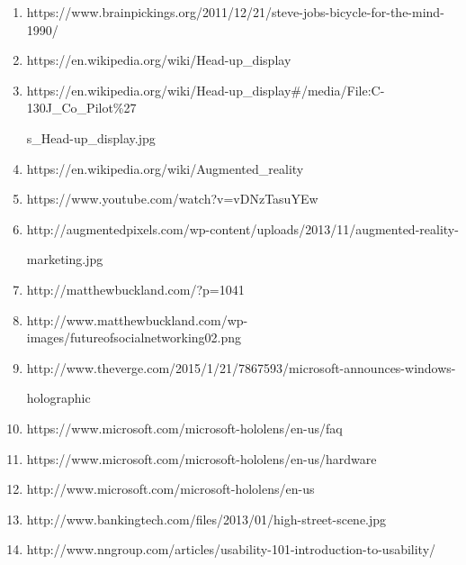 \documentclass[a4paper,12pt]{article}
\begin{document}
\begin{enumerate}
    \item https://www.brainpickings.org/2011/12/21/steve-jobs-bicycle-for-the-mind-1990/
    \item https://en.wikipedia.org/wiki/Head-up\_display
    \item https://en.wikipedia.org/wiki/Head-up\_display\#/media/File:C-130J\_Co\_Pilot\%27

    s\_Head-up\_display.jpg
    \item https://en.wikipedia.org/wiki/Augmented\_reality
    \item https://www.youtube.com/watch?v=vDNzTasuYEw
    \item http://augmentedpixels.com/wp-content/uploads/2013/11/augmented-reality-

    marketing.jpg
    \item http://matthewbuckland.com/?p=1041
    \item http://www.matthewbuckland.com/wp-images/futureofsocialnetworking02.png
    \item http://www.theverge.com/2015/1/21/7867593/microsoft-announces-windows-

    holographic
	\item https://www.microsoft.com/microsoft-hololens/en-us/faq
	\item https://www.microsoft.com/microsoft-hololens/en-us/hardware
    \item http://www.microsoft.com/microsoft-hololens/en-us
    \item http://www.bankingtech.com/files/2013/01/high-street-scene.jpg
    \item http://www.nngroup.com/articles/usability-101-introduction-to-usability/
\end{enumerate}
\end{document}
